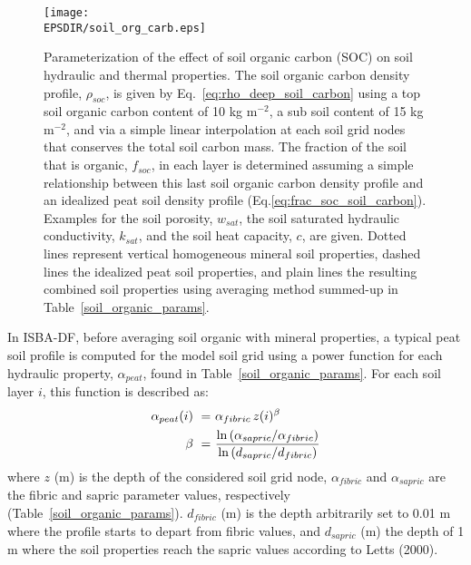 \begin{figure}[!b]
\centerline{
\texttt{[image: \\EPSDIR/soil\_org\_carb.eps]}}
\caption{Parameterization of the effect of soil organic carbon (SOC) on soil
hydraulic and thermal properties. The soil organic carbon density
profile, $\rho_{soc}$, is given by 
Eq.~\ref{eq:rho_deep_soil_carbon} 
using a top soil organic
carbon content of 10 kg m$^{-2}$, a sub soil content 
of 15 kg m$^{-2}$, and via
a simple linear interpolation at each soil grid nodes that conserves
the total soil carbon mass. The fraction of the soil that is organic,
$f_{soc}$, in each layer is determined assuming a simple relationship
between this last soil organic carbon density profile and an idealized
peat soil density profile 
(Eq.\ref{eq:frac_soc_soil_carbon}). 
Examples for the soil
porosity, $w_{sat}$, the soil saturated hydraulic conductivity, $k_{sat}$, and
the soil heat capacity, $c$, are given. Dotted lines represent vertical
homogeneous mineral soil properties, dashed lines the idealized peat
soil properties, and plain lines the resulting combined soil
properties using averaging method summed-up in Table~\ref{soil_organic_params}.}
\label{fig:soil_organic_carbon_profiles}
\end{figure}



In ISBA-DF, before averaging soil organic with mineral properties, a
typical peat soil profile is computed for the model soil grid using a
power function for each hydraulic property, $\alpha_{peat}$, found in 
Table~\ref{soil_organic_params}. 
For each soil layer $i$, this function is described as:
%
\begin{align}
\label{eq:alpha_peat_soil_carbon}
%
\alpha_{peat}(i) \,\,=&\,\, \alpha_{fibric} \, z(i)^\beta  
\\
\beta \,\,=&\,\,
\frac
{{\rm ln}\left( \alpha_{sapric} / \alpha_{fibric} \right)}
{{\rm ln}\left(d_{sapric} / d_{fibric} \right)}
%
\end{align}
%
where $z$ (m) is the depth of the considered soil grid node, $\alpha_{fibric}$ and
$\alpha_{sapric}$ are the fibric and sapric parameter values,
respectively (Table~\ref{soil_organic_params}). 
$d_{fibric}$ (m) is
the depth arbitrarily set to 0.01 m where the profile starts to depart
from fibric values, and $d_{sapric}$ (m) the depth of 1 m where the soil
properties reach the sapric values according to Letts \etal (2000)\nocite{Letts_ea_2000}.

